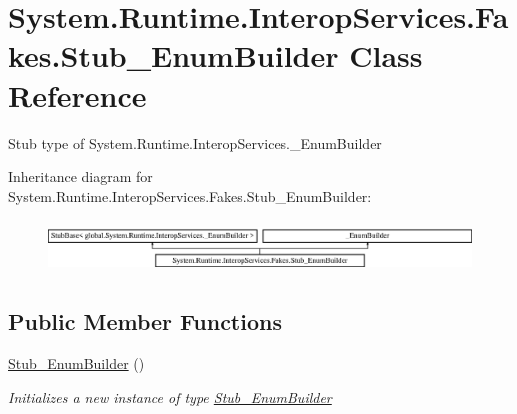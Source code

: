\hypertarget{class_system_1_1_runtime_1_1_interop_services_1_1_fakes_1_1_stub___enum_builder}{\section{System.\-Runtime.\-Interop\-Services.\-Fakes.\-Stub\-\_\-\-Enum\-Builder Class Reference}
\label{class_system_1_1_runtime_1_1_interop_services_1_1_fakes_1_1_stub___enum_builder}
}


Stub type of System.\-Runtime.\-Interop\-Services.\-\_\-\-Enum\-Builder 


Inheritance diagram for System.\-Runtime.\-Interop\-Services.\-Fakes.\-Stub\-\_\-\-Enum\-Builder\-:\begin{figure}[H]
\begin{center}
\leavevmode
\includegraphics[height=1.407035cm]{class_system_1_1_runtime_1_1_interop_services_1_1_fakes_1_1_stub___enum_builder}
\end{center}
\end{figure}
\subsection*{Public Member Functions}
\begin{DoxyCompactItemize}
\item 
\hyperlink{class_system_1_1_runtime_1_1_interop_services_1_1_fakes_1_1_stub___enum_builder_a10f25691603888951faeeb2b93adad6d}{Stub\-\_\-\-Enum\-Builder} ()
\begin{DoxyCompactList}\small\item\em Initializes a new instance of type \hyperlink{class_system_1_1_runtime_1_1_interop_services_1_1_fakes_1_1_stub___enum_builder}{Stub\-\_\-\-Enum\-Builder}\end{DoxyCompactList}\end{DoxyCompactItemize}
